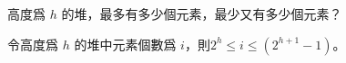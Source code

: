 \startEXERCISE
高度爲 $h$ 的堆，最多有多少個元素，最少又有多少個元素？
\stopEXERCISE

\startANSWER
令高度爲 $h$ 的堆中元素個數爲 $i$，則$2^h \le i \le (2^{h+1} - 1)$。
\stopANSWER
